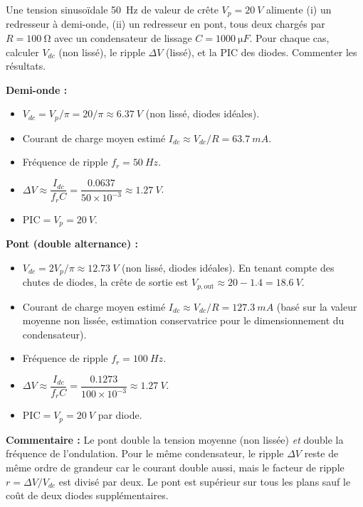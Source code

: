 \documentclass[11pt]{article}
\begin{document}
\begin{exercice}
Une tension sinusoïdale \SI{50}{Hz} de valeur de crête $V_p = \SI{20}{V}$ alimente (i) un redresseur à demi-onde, (ii) un redresseur en pont, tous deux chargés par $R = \SI{100}{\ohm}$ avec un condensateur de lissage $C = \SI{1000}{\micro F}$. Pour chaque cas, calculer $V_{dc}$ (non lissé), le ripple $\Delta V$ (lissé), et la PIC des diodes. Commenter les résultats.
\end{exercice}

\begin{corrige}[Exercice 1]
\textbf{Demi-onde :}
\begin{itemize}
\item $V_{dc} = V_p/\pi = 20/\pi \approx \SI{6.37}{V}$ (non lissé, diodes idéales).
\item Courant de charge moyen estimé $I_{dc} \approx V_{dc}/R = \SI{63.7}{mA}$.
\item Fréquence de ripple $f_r = \SI{50}{Hz}$.
\item $\Delta V \approx \dfrac{I_{dc}}{f_r C} = \dfrac{0.0637}{50 \times 10^{-3}} \approx \SI{1.27}{V}$.
\item $\mathrm{PIC} = V_p = \SI{20}{V}$.
\end{itemize}

\textbf{Pont (double alternance) :}
\begin{itemize}
\item $V_{dc} = 2V_p/\pi \approx \SI{12.73}{V}$ (non lissé, diodes idéales). En tenant compte des chutes de diodes, la crête de sortie est $V_{p,\text{out}} \approx 20 - 1.4 = \SI{18.6}{V}$.
\item Courant de charge moyen estimé $I_{dc} \approx V_{dc}/R = \SI{127.3}{mA}$ (basé sur la valeur moyenne non lissée, estimation conservatrice pour le dimensionnement du condensateur).
\item Fréquence de ripple $f_r = \SI{100}{Hz}$.
\item $\Delta V \approx \dfrac{I_{dc}}{f_r C} = \dfrac{0.1273}{100 \times 10^{-3}} \approx \SI{1.27}{V}$.
\item $\mathrm{PIC} = V_p = \SI{20}{V}$ par diode.
\end{itemize}

\textbf{Commentaire :} Le pont double la tension moyenne (non lissée) \emph{et} double la fréquence de l'ondulation. Pour le même condensateur, le ripple $\Delta V$ reste de même ordre de grandeur car le courant double aussi, mais le facteur de ripple $r = \Delta V/V_{dc}$ est divisé par deux. Le pont est supérieur sur tous les plans sauf le coût de deux diodes supplémentaires.
\end{corrige}
\end{document}
